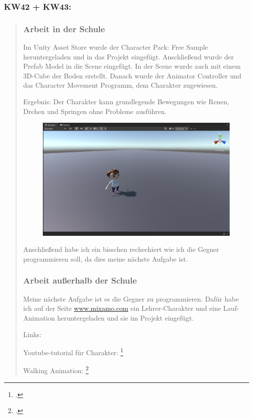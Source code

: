 


\subsubsection{KW42 + KW43:}
\begin{quote}
	\subsubsection*{Arbeit in der Schule}
	
	Im Unity Asset Store wurde der Character Pack: Free Sample
	heruntergeladen und in das Projekt eingefügt. Anschließend wurde der
	Prefab Model in die Scene eingefügt. In der Scene wurde auch mit einem
	3D-Cube der Boden erstellt. Danach wurde der Animator
	Controller und das Character Movement Programm, dem Charakter
	zugewiesen.
	
	Ergebnis: Der Charakter kann grundlegende Bewegungen wie Renen, Drehen
	und Springen ohne Probleme ausführen.
	\begin{figure}
		\centering
		\includegraphics[width=0.6\linewidth]{img/SemihSoenmez_IMG/Main-Charakter_SS_KW45_131121}
		\caption{}
		\label{fig:main-charaktersskw45131121}
	\end{figure}
	
	
	Anschließend habe ich ein bisschen rechechiert wie ich die Gegner
	programmieren soll, da dies meine nächste Aufgabe ist.

	\subsubsection*{Arbeit außerhalb der Schule}
	Meine nächste Aufgabe ist es die Gegner zu programmieren. Dafür habe ich
	auf der Seite \url{www.mixamo.com} ein Lehrer-Charakter und eine
	Lauf-Animation heruntergeladen und sie im Projekt eingefügt.
	
	Links:


	Youtube-tutorial für Charakter: \footcite{CharakterTutorial}
	
	Walking Animation: \footcite{WalkingAnimation}
	

\end{quote}
